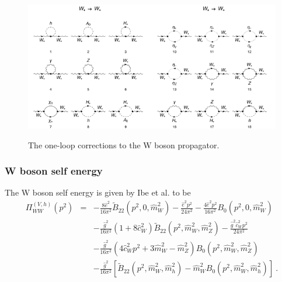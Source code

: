 \documentclass[11pt]{article}
\begin{document}
\begin{figure}[h!]
\center
\includegraphics[width=0.5\textwidth]{diagrams_V[3]_1_1.pdf}\includegraphics[width=0.5\textwidth]{diagrams_V[3]_1_2.pdf}
\caption{The one-loop corrections to the W boson propagator.}\label{fig:WW}
\end{figure}

\subsubsection{W boson self energy}
The W boson self energy is given by Ibe et al. to be
{\small
\begin{eqnarray}
\Pi_{WW}^{(V, h)}(p^2) &=&
-\frac{8\hat{e}^2}{16\pi^2} \tilde B_{22}(p^2, 0, \hat{m}_W^2)
-\frac{\hat{e}^2 p^2}{24\pi^2}
-\frac{4\hat{e}^2 p^2}{16\pi^2} B_0(p^2, 0, \hat{m}_W^2) \nonumber \\
&& -\frac{\hat{g}^2}{16\pi^2}(1 + 8\hat{c}_W^2)
\tilde{B}_{22}(p^2, \hat{m}_W^2, \hat{m}_Z^2)
-\frac{\hat{g}^2 \hat{c}_W^2 p^2}{24\pi^2} \nonumber \\
&& -\frac{\hat g^2}{16\pi^2}( 4 \hat c_W^2 p^2 + 3 \hat m_W^2 - \hat m_Z^2) B_0( p^2, \hat m_W^2, \hat m_Z^2) \nonumber\\
&& -\frac{\hat{g}^2}{16\pi^2}
[ \tilde{B}_{22}(p^2, \hat{m}_W^2, \hat{m}_h^2)
-\hat{m}_W^2 B_0(p^2, \hat{m}_W^2, \hat{m}_h^2) ]\ .\label{eqn:WW}
\end{eqnarray}
}
\end{document}
